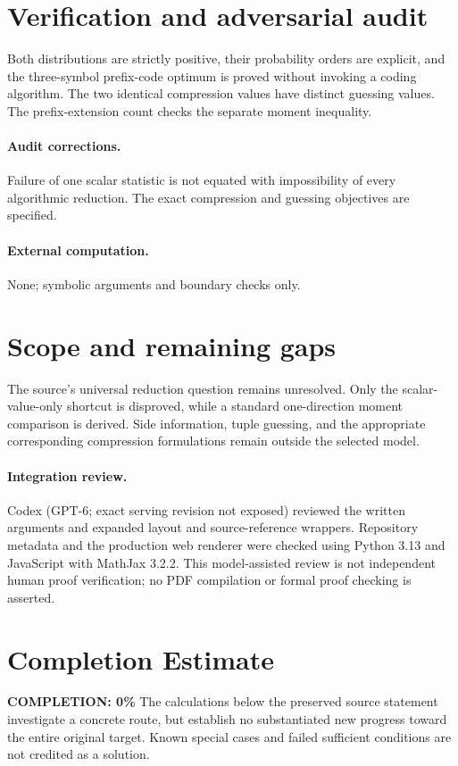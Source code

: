\documentclass[11pt]{article}
\begin{document}
\section{Verification and adversarial audit}
Both distributions are strictly positive, their probability orders are explicit, and the three-symbol prefix-code optimum is proved without invoking a coding algorithm. The two identical compression values have distinct guessing values. The prefix-extension count checks the separate moment inequality.
\paragraph{Audit corrections.} Failure of one scalar statistic is not equated with impossibility of every algorithmic reduction. The exact compression and guessing objectives are specified.
\paragraph{External computation.} None; symbolic arguments and boundary checks only.
\section{Scope and remaining gaps}
The source's universal reduction question remains unresolved. Only the scalar-value-only shortcut is disproved, while a standard one-direction moment comparison is derived. Side information, tuple guessing, and the appropriate corresponding compression formulations remain outside the selected model.
\paragraph{Integration review.} Codex (GPT-6; exact serving revision not exposed) reviewed the written arguments and expanded layout and source-reference wrappers. Repository metadata and the production web renderer were checked using Python 3.13 and JavaScript with MathJax 3.2.2. This model-assisted review is not independent human proof verification; no PDF compilation or formal proof checking is asserted.

\section{Completion Estimate}
\noindent\textbf{COMPLETION: 0\%}
The calculations below the preserved source statement investigate a concrete route,
but establish no substantiated new progress toward the entire original target.
Known special cases and failed sufficient conditions are not credited as a solution.
\end{document}
